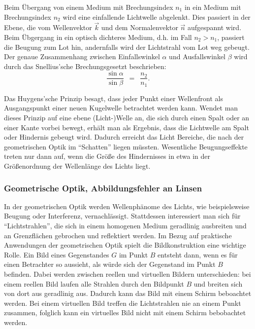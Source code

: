 \documentclass{article}
\newcommand{\widespace}{\enspace}
\newcommand{\wideeq}{\widespace = \widespace}
\begin{document}
Beim Übergang von einem Medium mit Brechungsindex $n_1$ in ein Medium
mit Brechungsindex $n_2$ wird eine einfallende Lichtwelle abgelenkt.
Dies passiert in der Ebene, die vom Wellenvektor $\vec k$ und dem
Normalenvektor $\vec n$ aufgespannt wird.
Beim Übgergang in ein optisch dichteres Medium, d.h. im Fall $n_2 > n_1$, passiert
die Beugung zum Lot hin, andernfalls wird der Lichtstrahl vom Lot weg gebeugt.
Der genaue Zusammenhang zwischen Einfallswinkel $\alpha$ und Ausfallswinkel $\beta$
wird durch das Snellius'sche Brechungsgesetzt beschrieben:
\[
    \frac{\sin \alpha}{\sin \beta} \wideeq \frac {n_2}{n_1}.
\]

Das Huygens'sche Prinzip besagt, dass jeder Punkt einer Wellenfront als
Ausgangspunkt einer neuen Kugelwelle betrachtet werden kann.
Wendet man dieses Prinzip auf eine ebene (Licht-)Welle an, die sich durch einen Spalt
oder an einer Kante vorbei bewegt, erhält man als Ergebnis, dass die Lichtwelle
am Spalt oder Hindernis gebeugt wird. Dadurch erreicht das Licht Bereiche,
die nach der geometrischen Optik im ``Schatten'' liegen müssten.
Wesentliche Beugungseffekte treten nur dann auf, wenn die Größe des Hindernisses
in etwa in der Größenordnung der Wellenlänge des Lichts liegt.

\cite[31--34, 140--142]{zinth}


\subsubsection{Geometrische Optik, Abbildungsfehler an Linsen}

In der geometrischen Optik werden Wellenphänome des Lichts, wie beispielsweise
Beugung oder Interferenz, vernachlässigt. Stattdessen interessiert man sich für
``Lichtstrahlen'', die sich in einem homogenen Medium geradlinig ausbreiten
und an Grenzflächen gebrochen und reflektiert werden.
Im Bezug auf praktische Anwendungen der geometrischen Optik spielt die
Bildkonstruktion eine wichtige Rolle. Ein Bild eines Gegenstandes $G$ im Punkt
$B$ entsteht dann, wenn es für einen Betrachter so aussieht, als würde sich
der Gegenstand im Punkt $B$ befinden. Dabei werden zwischen reellen und virtuellen
Bildern unterschieden: bei einem reellen Bild laufen alle Strahlen durch den
Bildpunkt $B$ und breiten sich von dort aus geradlinig aus. Dadurch kann das
Bild mit einem Schirm beboachtet werden. Bei einem virtuellen Bild treffen
die Lichtstrahlen nie an einem Punkt zusammen, folglich kann ein virtuelles
Bild nicht mit einem Schirm bebobachtet werden.
\end{document}
